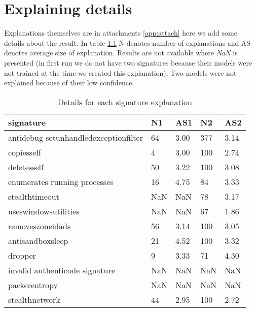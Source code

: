 \chapter{Explaining details} \label{app:expl}
Explanations themselves are in attachments \ref{app:attach} here we add some details about the result. In table \ref{tab:expdet} N denotes number of explanations and AS denotes average size of explanation. Results are not available where \emph{NaN} is presented (in first run we do not have two signatures because their models were not trained at the time we created this explanation). Two models were not explained because of their low confidence.

\begin{table}[h]
    \centering
    \caption{Details for each signature explanation}
    \begin{tabular}{lllll}
      \toprule
      \textbf{signature} &
      \textbf{N1} &
      \textbf{AS1} &
      \textbf{N2} &
      \textbf{AS2}
      \\
      \midrule
      antidebug setunhandledexceptionfilter & 64 & 3.00 & 377 & 3.14  \\
      \midrule
      copiesself & 4 & 3.00 & 100 & 2.74 \\
      \midrule
      deletesself & 50 & 3.22 & 100 & 3.08 \\
      \midrule
      enumerates running processes & 16 & 4.75 & 84 & 3.33 \\
      \midrule
      stealthtimeout & NaN & NaN & 78 &  3.17 \\
      \midrule
      useswindowsutilities & NaN & NaN & 67 &  1.86 \\
      \midrule
      removeszoneidads & 56 & 3.14 & 100 & 3.05 \\
      \midrule
      antisandboxsleep & 21 & 4.52 & 100 & 3.32 \\
      \midrule
      dropper & 9 & 3.33 & 71 & 4.30 \\
      \midrule
      invalid authenticode signature &  NaN &  NaN &  NaN &  NaN \\
      \midrule
      packerentropy & NaN &  NaN &  NaN &  NaN \\
      \midrule
      stealthnetwork & 44 & 2.95 & 100 & 2.72 \\
      \bottomrule
    \end{tabular}
    \label{tab:expdet}
  \end{table}